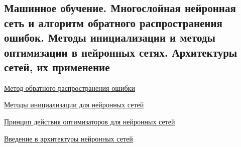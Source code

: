 \subsection{Машинное обучение. Многослойная нейронная сеть и алгоритм обратного распространения ошибок. Методы инициализации и методы оптимизации в нейронных сетях. Архитектуры сетей, их применение}

\href{https://ru.wikipedia.org/wiki/%D0%9C%D0%B5%D1%82%D0%BE%D0%B4_%D0%BE%D0%B1%D1%80%D0%B0%D1%82%D0%BD%D0%BE%D0%B3%D0%BE_%D1%80%D0%B0%D1%81%D0%BF%D1%80%D0%BE%D1%81%D1%82%D1%80%D0%B0%D0%BD%D0%B5%D0%BD%D0%B8%D1%8F_%D0%BE%D1%88%D0%B8%D0%B1%D0%BA%D0%B8}{Метод обратного распространения ошибки}

\href{https://machinelearningmastery.ru/initialization-techniques-for-neural-networks-f4ce8e64effc/}{Методы инициализации для нейронных сетей}

\href{https://habr.com/ru/company/skillfactory/blog/552394/}{Принцип действия оптимизаторов для нейронных сетей}

\href{https://habr.com/ru/company/oleg-bunin/blog/340184/}{Введение в архитектуры нейронных сетей}